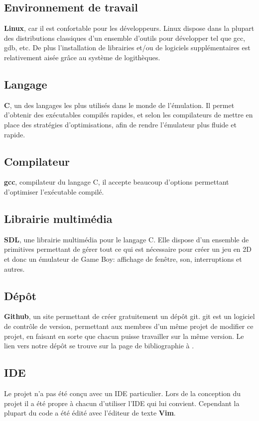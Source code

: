 \documentclass{report}
\begin{document}
\subsection{Environnement de travail}
\textbf{Linux}, car il est confortable pour les développeurs. Linux dispose dans la plupart des distributions classiques d'un ensemble d'outils pour développer tel que gcc, gdb, etc. De plus l'installation de librairies et/ou de logiciels supplémentaires est relativement aisée grâce au système de logithèques.

\subsection{Langage}
\textbf{C}, un des langages les plus utilisés dans le monde de l'émulation. Il permet d'obtenir des exécutables compilés rapides, et selon les compilateurs de mettre en place des stratégies d'optimisations, afin de rendre l'émulateur plus fluide et rapide.

\subsection{Compilateur}
\textbf{gcc}, compilateur du langage C, il accepte beaucoup d'options permettant d'optimiser l'exécutable compilé.

\subsection{Librairie multimédia}
\textbf{SDL}, une librairie multimédia pour le langage C. Elle dispose d'un ensemble de primitives permettant de gérer tout ce qui est nécessaire pour créer un jeu en 2D et donc un émulateur de Game Boy: affichage de fenêtre, son, interruptions et autres.

\subsection{Dépôt}
\textbf{Github}, un site permettant de créer gratuitement un dépôt git. git est un logiciel de contrôle de version, permettant aux membres d'un même projet de modifier ce projet, en faisant en sorte que chacun puisse travailler sur la même version. Le lien vers notre dépôt se trouve sur la page de bibliographie à \cite{github}.

\subsection{IDE}
Le projet n'a pas été conçu avec un IDE particulier. Lors de la conception du projet il a été propre à chacun d'utiliser l'IDE qui lui convient. Cependant la plupart du code a été édité avec l'éditeur de texte \textbf{Vim}.
\end{document}
